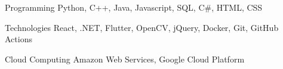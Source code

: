 
\begin{cvskills}
  \cvskill 
    {Programming}
    {Python, C++, Java, Javascript, SQL, C\#, HTML, CSS}

    \cvskill 
    {Technologies}
    {React, .NET, Flutter, OpenCV, jQuery, Docker, Git, GitHub Actions}

    \cvskill 
    {Cloud Computing}
    {Amazon Web Services, Google Cloud Platform}
\end{cvskills}
